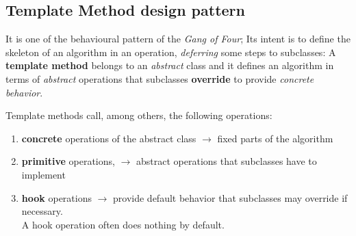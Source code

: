 
\subsection{Template Method design pattern}
It is one of the behavioural pattern of the \textit{Gang of Four};
Its intent is to define the skeleton of an algorithm in an operation,
\textit{deferring} some steps to subclasses:
A \textbf{template method} belongs to an \textit{abstract} class and it defines an algorithm in terms of \textit{abstract} operations that subclasses \textbf{override}
to provide \textit{concrete behavior}.

{Template methods call, among others, the following operations:\ns
\begin{enumerate}
   \item \textbf{concrete} operations of the abstract class $\longrightarrow$ fixed parts of the algorithm
   \item \textbf{primitive} operations, $\longrightarrow$ abstract operations that subclasses have to implement
   \item \textbf{hook} operations $\longrightarrow$ provide default behavior that subclasses may override if necessary.\\
   A hook operation often does nothing by default.
\end{enumerate}}

